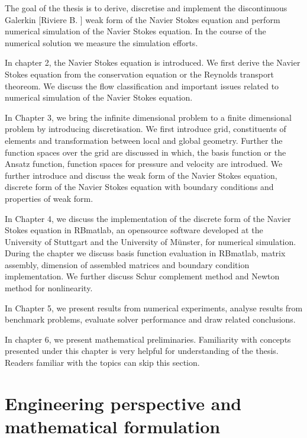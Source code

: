 \documentclass[a4paper]{book}
\begin{document}
The goal of the thesis is to derive, discretise and implement the discontinuous Galerkin [Riviere B. \cite{riviere}] weak form of the Navier Stokes equation and perform numerical simulation of the Navier Stokes equation. In the course of the numerical solution we measure the simulation efforts. 

In chapter 2, the Navier Stokes equation is introduced. We first derive the Navier Stokes equation from the conservation equation or the Reynolds transport theoreom. We discuss the flow classification and important issues related to numerical simulation of the Navier Stokes equation. 

In Chapter 3, we bring the infinite dimensional problem to a finite dimensional problem by introducing discretisation. We first introduce grid, constituents of elements and transformation between local and global geometry. Further the function spaces over the grid are discussed in which, the basis function or the Ansatz function, function spaces for pressure and velocity are introdued. We further introduce and discuss the weak form of the Navier Stokes equation, discrete form of the Navier Stokes equation with boundary conditions and properties of weak form.

In Chapter 4, we discuss the implementation of the discrete form of the Navier Stokes equation in RBmatlab, an opensource software developed at the University of Stuttgart and the University of M\"unster, for numerical simulation. During the chapter we discuss basis function evaluation in RBmatlab, matrix assembly, dimension of assembled matrices and boundary condition implementation. We further discuss Schur complement method and Newton method for nonlinearity.

In Chapter 5, we present results from numerical experiments, analyse results from benchmark problems, evaluate solver performance and draw related conclusions.

In chapter 6, we present mathematical preliminaries. Familiarity with concepts presented under this chapter is very helpful for understanding of the thesis. Readers familiar with the topics can skip this section.

\newpage

\chapter[Perspective and Formulation]{Engineering perspective and mathematical formulation} 
\end{document}
